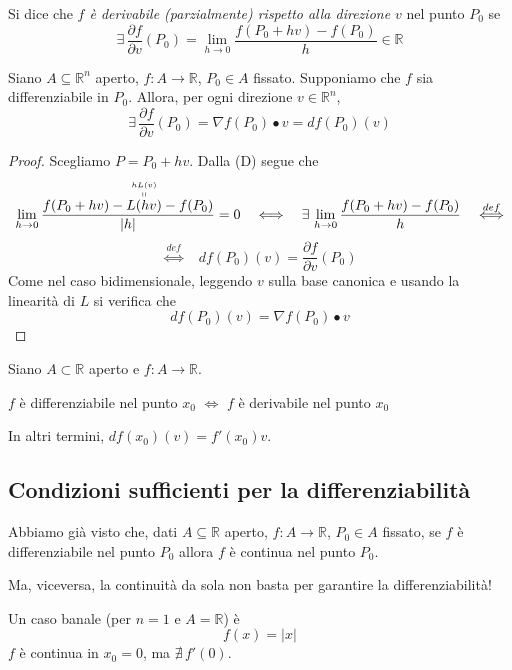 \begin{definition}
Si dice che \emph{$f$ è derivabile (parzialmente) rispetto alla direzione $v$} nel punto $P_0$ se
$$
\exists \, \frac{\partial f}{\partial v} (P_0)= \lim_{h \rightarrow 0} \frac{f(P_0+hv)-f(P_0)}{h} \in \mathbb{R}
$$
\end{definition}

\begin{proposition}
Siano $A \subseteq \mathbb{R}^n$ aperto, $f: A \longrightarrow \mathbb{R}$, $P_0 \in A$ fissato. Supponiamo che $f$ sia differenziabile in $P_0$. Allora, per ogni direzione $v \in \mathbb{R}^n$,
$$
\exists \, \frac{\partial f}{\partial v} (P_0) = \nabla f(P_0) \bullet v = df(P_0)(v)
$$
\end{proposition}
\begin{proof}
Scegliamo $P=P_0+hv$. Dalla (D) segue che
$$ \lim_{h \rightarrow 0} \frac{f(P_0+hv)-\overset{\overset{hL(v)}{\shortparallel}}{L(hv)}-f(P_0)}{|h|} = 0 \quad \Longleftrightarrow \quad \exists \, \lim_{h \rightarrow 0} \frac{f(P_0+hv)-f(P_0)}{h} \quad \overset{def}{\Longleftrightarrow}$$
$$\overset{def}{\Longleftrightarrow} \quad df(P_0)(v) = \frac{\partial f}{\partial v} (P_0)$$
Come nel caso bidimensionale, leggendo $v$ sulla base canonica e usando la linearità di $L$ si verifica che
$$
df(P_0)(v) = \nabla f(P_0) \bullet v
$$
\end{proof}

\begin{obs}[$n=1$]
Siano $A \subset \mathbb{R}$ aperto e $f: A \longrightarrow \mathbb{R}$.
\begin{center}
$f$ è differenziabile nel punto $x_0$ $\Longleftrightarrow$ $f$ è derivabile nel punto $x_0$
\end{center}
In altri termini, $df(x_0)(v) = f'(x_0)v$.
\end{obs}

\subsection{Condizioni sufficienti per la differenziabilità}
Abbiamo già visto che, dati $A \subseteq \mathbb{R}$ aperto, $f:A \longrightarrow \mathbb{R}$, $P_0 \in A$ fissato, se $f$ è differenziabile nel punto $P_0$ allora $f$ è continua nel punto $P_0$.

Ma, viceversa, la continuità da sola non basta per garantire la differenziabilità!

Un caso banale (per $n=1$ e $A = \mathbb{R}$) è
$$f(x) = |x|$$
$f$ è continua in $x_0 = 0$, ma $\nexists \, f'(0)$.

